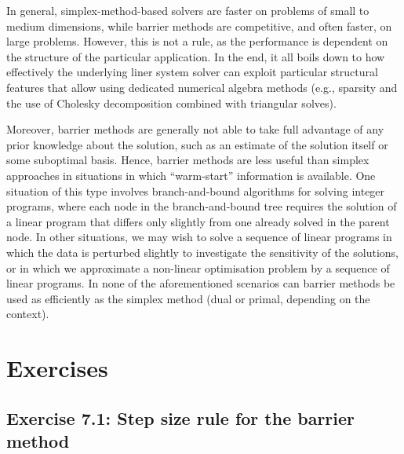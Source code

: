 In general, simplex-method-based solvers are faster on problems of small to medium dimensions, while barrier methods are competitive, and often faster, on large problems. However, this is not a rule, as the performance is dependent on the structure of the particular application. In the end, it all boils down to how effectively the underlying liner system solver can exploit particular structural features that allow using dedicated numerical algebra methods (e.g., sparsity and the use of Cholesky decomposition combined with triangular solves).

Moreover, barrier methods are generally not able to take full advantage of any prior knowledge about the solution, such as an estimate of the solution itself or some suboptimal basis. Hence, barrier methods are less useful than simplex approaches in situations in which ``warm-start'' information is available. One situation of this type involves branch-and-bound algorithms for solving integer programs, where each node in the branch-and-bound tree requires the solution of a linear program that differs only slightly from one already solved in the parent node. In other situations, we may wish to solve a sequence of linear programs in which the data is perturbed slightly to investigate the sensitivity of the solutions, or in which we approximate a non-linear optimisation problem by a sequence of linear programs. In none of the aforementioned scenarios can barrier methods be used as efficiently as the simplex method (dual or primal, depending on the context).

\vfill
\pagebreak	

\section{Exercises}


\subsection*{Exercise 7.1: Step size rule for the barrier method}




